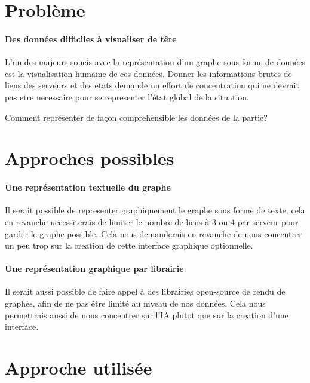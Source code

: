 \documentclass{scrreprt}
\begin{document}
    \section{Problème}

    \paragraph{Des données difficiles à visualiser de tête}
    L'un des majeurs soucis avec la représentation d'un graphe sous forme de
    données est la visualisation humaine de ces données.
    Donner les informations brutes de liens des serveurs et des etats demande
    un effort de concentration qui ne devrait pas etre necessaire pour se
    representer l'état global de la situation.

    \begin{problem}
        Comment représenter de façon comprehensible les données de la partie?
    \end{problem}

    \section{Approches possibles}

    \paragraph{Une représentation textuelle du graphe}
    Il serait possible de representer graphiquement le graphe sous forme de
    texte, cela en revanche necessiterais de limiter le nombre de liens à 3
    ou 4 par serveur pour garder le graphe possible.
    Cela nous demanderais en revanche de nous concentrer un peu trop sur
    la creation de cette interface graphique optionnelle.

    \paragraph{Une représentation graphique par librairie}
    Il serait aussi possible de faire appel à des librairies open-source de
    rendu de graphes, afin de ne pas être limité au niveau de nos données.
    Cela nous permettrais aussi de nous concentrer sur l'IA plutot que sur la
    creation d'une interface.

    \section{Approche utilisée}
\end{document}
